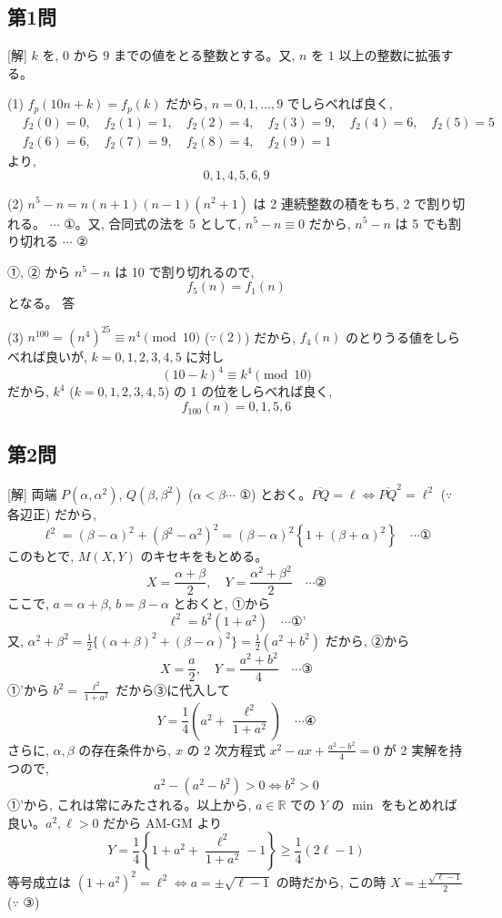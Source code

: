 \documentclass[../main.tex]{subfiles}
\begin{document}
\subsection*{第1問}

[解] $k$ を, $0$ から $9$ までの値をとる整数とする。又, $n$ を $1$ 以上の整数に拡張する。

(1) $f_p(10n+k) = f_p(k)$ だから, $n = 0, 1, \dots, 9$ でしらべれば良く,
\[
  \begin{aligned}
    &f_2(0) = 0, \quad f_2(1) = 1, \quad f_2(2) = 4, \quad f_2(3) = 9, \quad f_2(4) = 6, \quad f_2(5) = 5 \\
    &f_2(6) = 6, \quad f_2(7) = 9, \quad f_2(8) = 4, \quad f_2(9) = 1
  \end{aligned}
\]
より,
\[
  0, 1, 4, 5, 6, 9
\]

(2) $n^5 - n = n(n+1)(n-1)(n^2+1)$ は 2 連続整数の積をもち, 2 で割り切れる。 $\cdots$ ①。又, 合同式の法を 5 として, $n^5 - n \equiv 0$ だから, $n^5 - n$ は 5 でも割り切れる $\cdots$ ②

①, ② から $n^5 - n$ は 10 で割り切れるので,
\[
  f_5(n) = f_1(n)
\]
となる。 \quad 答

(3) $n^{100} = (n^4)^{25} \equiv n^4 \pmod{10}$ ($\because (2)$) だから, $f_4(n)$ のとりうる値をしらべれば良いが, $k = 0, 1, 2, 3, 4, 5$ に対し
\[
  (10-k)^4 \equiv k^4 \pmod{10}
\]
だから, $k^4$ ($k=0, 1, 2, 3, 4, 5$) の 1 の位をしらべれば良く,
\[
  f_{100}(n) = 0, 1, 5, 6
\]

\subsection*{第2問}

[解] 両端 $P(\alpha, \alpha^2)$, $Q(\beta, \beta^2)$ ($\alpha < \beta \cdots$ ①) とおく。$\overline{PQ} = \ell \iff \overline{PQ}^2 = \ell^2$ ($\because$ 各辺正) だから,
\[
  \ell^2 = (\beta - \alpha)^2 + (\beta^2 - \alpha^2)^2 = (\beta - \alpha)^2 \left\{ 1 + (\beta + \alpha)^2 \right\} \quad \cdots \text{①}
\]
このもとで, $M(X,Y)$ のキセキをもとめる。
\[
  X = \frac{\alpha + \beta}{2}, \quad Y = \frac{\alpha^2 + \beta^2}{2} \quad \cdots \text{②}
\]
ここで, $a = \alpha + \beta$, $b = \beta - \alpha$ とおくと, ①から
\[
  \ell^2 = b^2(1+a^2) \quad \cdots \text{①'}
\]
又, $\alpha^2 + \beta^2 = \frac{1}{2}\{(\alpha+\beta)^2 + (\beta-\alpha)^2\} = \frac{1}{2}(a^2+b^2)$ だから, ②から
\[
  X = \frac{a}{2}, \quad Y = \frac{a^2+b^2}{4} \quad \cdots \text{③}
\]
①'から $b^2 = \frac{\ell^2}{1+a^2}$ だから③に代入して
\[
  Y = \frac{1}{4}\left( a^2 + \frac{\ell^2}{1+a^2} \right) \quad \cdots \text{④}
\]
さらに, $\alpha, \beta$ の存在条件から, $x$ の 2 次方程式 $x^2 - ax + \frac{a^2-b^2}{4} = 0$ が 2 実解を持つので,
\[
  a^2 - (a^2 - b^2) > 0 \iff b^2 > 0
\]
①'から, これは常にみたされる。以上から, $a \in \mathbb{R}$ での $Y$ の $\min$ をもとめれば良い。$a^2, \ell > 0$ だから AM-GM より
\[
  Y = \frac{1}{4} \left\{ 1 + a^2 + \frac{\ell^2}{1+a^2} - 1 \right\} \ge \frac{1}{4}(2\ell - 1)
\]
等号成立は $(1+a^2)^2 = \ell^2 \iff a = \pm\sqrt{\ell-1}$ の時だから, この時 $X = \pm\frac{\sqrt{\ell-1}}{2}$ ($\because$ ③)
\end{document}
